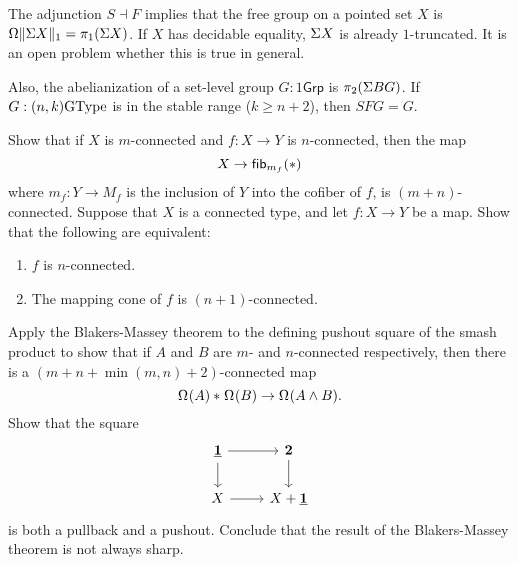 The adjunction ${S} \dashv {F}$ implies that the free group on a
pointed set $X$ is $\loopspacesym\trunc{1}{\susp X}=\pi_1(\susp X)$.  If $X$
has decidable equality, $\susp X$ is already $1$-truncated. It is an
open problem whether this is true in general.

Also, the abelianization of a set-level group $G : 1\mathsf{Grp}$ is
$\pi_2(\susp BG)$. If $G : (n,k)\GType$ is in the stable range ($k \ge
n+2$), then $SFG=G$.

\begin{exercises}
\exercise Show that if $X$ is $m$-connected and $f:X\to Y$ is $n$-connected, then the map
\begin{equation*}
X \to \fib{m_f}{\ast}
\end{equation*}
where $m_f:Y\to M_f$ is the inclusion of $Y$ into the cofiber of $f$, is $(m+n)$-connected.
\exercise Suppose that $X$ is a connected type, and let $f:X\to Y$ be a map.
Show that the following are equivalent:
\begin{enumerate}
\item $f$ is $n$-connected.
\item The mapping cone of $f$ is $(n+1)$-connected.
\end{enumerate}
\exercise Apply the Blakers-Massey theorem to the defining pushout square of the smash product to show that if $A$ and $B$ are $m$- and $n$-connected respectively, then there is a $(m+n+\min(m,n)+2)$-connected map
\begin{equation*}
\join{\loopspace{A}}{\loopspace{B}}\to \loopspace{A \wedge B}.
\end{equation*}
\exercise Show that the square
\begin{equation*}
\begin{tikzcd}
\unit \arrow[r] \arrow[d] & \bool \arrow[d] \\
X \arrow[r] & X+\unit
\end{tikzcd}
\end{equation*}
is both a pullback and a pushout. Conclude that the result of the Blakers-Massey theorem is not always sharp.
\end{exercises}
